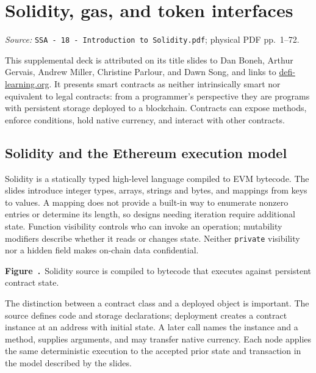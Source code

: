 \documentclass[11pt,a4paper]{article}
\newcommand{\currentmodule}{Contents}
\newcommand{\source}[2]{\textcolor{muted}{\small\textit{Source:} \nolinkurl{#1}; physical PDF pp.~#2.}\par\medskip}
\newcommand{\module}[2]{\par\Needspace{8\baselineskip}\gdef\currentmodule{#1}\section{#1}\label{#2}}
\numberwithin{figure}{section}
\newcommand{\diagramcaption}[1]{\par\smallskip\refstepcounter{figure}\begin{center}\small\textbf{Figure~\thefigure.}~#1\end{center}}
\begin{document}
\module{Solidity, gas, and token interfaces}{sec:solidity}
\source{SSA - 18 - Introduction to Solidity.pdf}{1--72}
This supplemental deck is attributed on its title slides to Dan Boneh, Arthur Gervais, Andrew Miller, Christine Parlour, and Dawn Song, and links to \href{https://defi-learning.org}{defi-learning.org}. It presents smart contracts as neither intrinsically smart nor equivalent to legal contracts: from a programmer's perspective they are programs with persistent storage deployed to a blockchain. Contracts can expose methods, enforce conditions, hold native currency, and interact with other contracts.

\subsection{Solidity and the Ethereum execution model}
Solidity is a statically typed high-level language compiled to EVM bytecode. The slides introduce integer types, arrays, strings and bytes, and mappings from keys to values. A mapping does not provide a built-in way to enumerate nonzero entries or determine its length, so designs needing iteration require additional state. Function visibility controls who can invoke an operation; mutability modifiers describe whether it reads or changes state. Neither \texttt{private} visibility nor a hidden field makes on-chain data confidential.

\begin{center}\end{center}
\diagramcaption{Solidity source is compiled to bytecode that executes against persistent contract state.}

The distinction between a contract class and a deployed object is important. The source defines code and storage declarations; deployment creates a contract instance at an address with initial state. A later call names the instance and a method, supplies arguments, and may transfer native currency. Each node applies the same deterministic execution to the accepted prior state and transaction in the model described by the slides.
\end{document}
